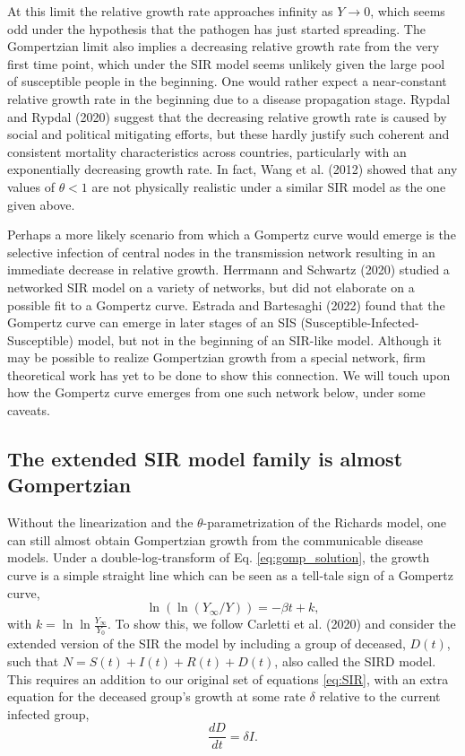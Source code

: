 \documentclass[sn-mathphys]{sn-jnl}%
\theoremstyle{thmstyleone}%
\theoremstyle{thmstyletwo}%
\theoremstyle{thmstylethree}%
\begin{document}
 At this limit the relative growth rate approaches infinity as $Y \rightarrow 0$, which seems odd under the hypothesis that the pathogen has just started spreading. 
 The Gompertzian limit also implies a decreasing relative growth rate from the very first time point, which under the SIR model seems unlikely given the large pool of susceptible people in the beginning. 
 One would rather expect a near-constant relative growth rate in the beginning due to a disease propagation stage. 
 Rypdal and Rypdal (2020) \cite{Rypdal2020} suggest that the decreasing relative growth rate is caused by social and political mitigating efforts, but these hardly justify such coherent and consistent mortality characteristics across countries, particularly with an exponentially decreasing growth rate. In fact, Wang et al. (2012) \cite{wang2012richards} showed that any values of $\theta<1$ are not physically realistic under a similar SIR model as the one given above. 
 
 Perhaps a more likely scenario from which a Gompertz curve would emerge is the selective infection of central nodes in the transmission network resulting in an immediate decrease in relative growth. 
 Herrmann and Schwartz (2020) \cite{herrmann2020covid} studied a networked SIR model on a variety of networks, but did not elaborate on a possible fit to a Gompertz curve. Estrada and Bartesaghi (2022) \cite{estrada2022networked} found that the Gompertz curve can emerge in later stages of an SIS (Susceptible-Infected-Susceptible) model, but not in the beginning of an SIR-like model.
 Although it may be possible to realize Gompertzian growth from a special network, firm theoretical work has yet to be done to show this connection. 
 We will touch upon how the Gompertz curve emerges from one such network below, under some caveats.

\subsection*{The extended SIR model family is almost Gompertzian}
Without the linearization and the $\theta$-parametrization of the Richards model, one can still almost obtain Gompertzian growth from the communicable disease models. Under a double-log-transform of Eq. \ref{eq:gomp_solution}, the growth curve is a simple straight line which can be seen as a tell-tale sign of a Gompertz curve,
\begin{equation}
\label{eq:GOMP_D}
\ln{(\ln{(Y_{\infty}/Y)})} = -\beta t + k,
\end{equation}
with $k=\ln{\ln{\frac{Y_{\infty}}{Y_{0}}}}$. To show this, we follow Carletti et al. (2020) \cite{carletti2020covid} and consider the extended version of the SIR the model by including a group of deceased, $D(t)$, such that $N = S(t) + I(t) + R(t) + D(t)$, also called the SIRD model. This requires an addition to our original set of equations \ref{eq:SIR}, with an extra equation for the deceased group's growth at some rate $\delta$ relative to the current infected group,
\begin{equation}
\frac{dD}{dt} = \delta I.
\end{equation}
\end{document}

